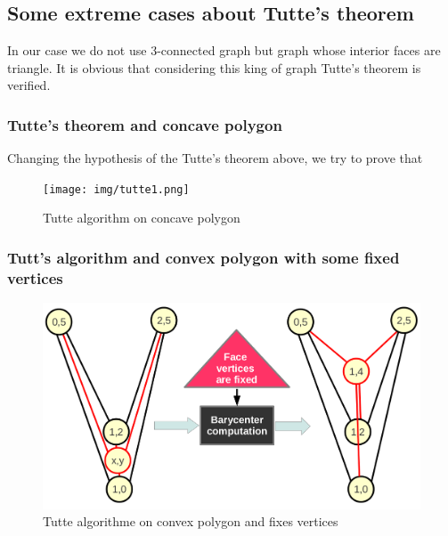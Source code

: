 \subsection{Some extreme cases about Tutte's theorem}
In our case we do not use 3-connected graph but graph whose interior faces are triangle. It is obvious that considering this king of graph Tutte's theorem is verified.
\subsubsection{Tutte's theorem and concave polygon}
Changing the hypothesis of the Tutte's theorem above, we try to prove that 

\begin {figure}[H]
  \centering
  \texttt{[image: img/tutte1.png]}
  \caption{Tutte algorithm on concave polygon}
  \label{struct3}
\end {figure}

\subsubsection{Tutt's algorithm and convex polygon with some fixed vertices}


\begin {figure}[H]
  \centering
  \includegraphics[scale=0.5]{img/tutte2.png}
  \caption{Tutte algorithme on convex polygon and fixes vertices}
  \label{struct3}
\end {figure}
